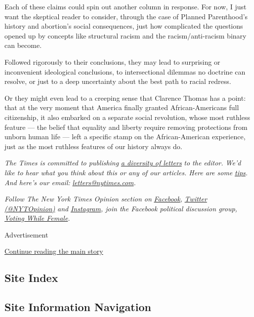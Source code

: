 Each of these claims could spin out another column in response. For now,
I just want the skeptical reader to consider, through the case of
Planned Parenthood's history and abortion's social consequences, just
how complicated the questions opened up by concepts like structural
racism and the racism/anti-racism binary can become.

Followed rigorously to their conclusions, they may lead to surprising or
inconvenient ideological conclusions, to intersectional dilemmas no
doctrine can resolve, or just to a deep uncertainty about the best path
to racial redress.

Or they might even lead to a creeping sense that Clarence Thomas has a
point: that at the very moment that America finally granted
African-Americans full citizenship, it also embarked on a separate
social revolution, whose most ruthless feature --- the belief that
equality and liberty require removing protections from unborn human life
--- left a specific stamp on the African-American experience, just as
the most ruthless features of our history always do.

\emph{The Times is committed to publishing}
\href{https://www.nytimes.com/2019/01/31/opinion/letters/letters-to-editor-new-york-times-women.html}{\emph{a
diversity of letters}} \emph{to the editor. We'd like to hear what you
think about this or any of our articles. Here are some}
\href{https://help.nytimes.com/hc/en-us/articles/115014925288-How-to-submit-a-letter-to-the-editor}{\emph{tips}}\emph{.
And here's our email:}
\href{mailto:letters@nytimes.com}{\emph{letters@nytimes.com}}\emph{.}

\emph{Follow The New York Times Opinion section on}
\href{https://www.facebook.com/nytopinion}{\emph{Facebook}}\emph{,}
\href{http://twitter.com/NYTOpinion}{\emph{Twitter (@NYTOpinion)}}
\emph{and}
\href{https://www.instagram.com/nytopinion/}{\emph{Instagram}}\emph{,
join the Facebook political discussion group,}
\href{https://www.facebook.com/groups/votingwhilefemale/}{\emph{Voting
While Female}}\emph{.}

Advertisement

\protect\hyperlink{after-bottom}{Continue reading the main story}

\hypertarget{site-index}{%
\subsection{Site Index}\label{site-index}}

\hypertarget{site-information-navigation}{%
\subsection{Site Information
Navigation}\label{site-information-navigation}}

